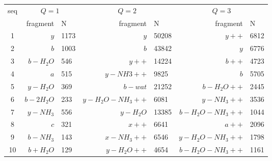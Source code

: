 \begin{table}
\begin{center}
\footnotesize
\begin{tabular}{crlrlrl}
\hline \hline
seq & \multicolumn{2}{c}{$Q=1$}&
\multicolumn{2}{c}{$Q=2$}&\multicolumn{2}{c}{$Q=3$}\\
&  fragment & N & fragment & N & fragment & N \\
\hline
1 & $y		$& 1173 & $y 		$&  50208  &$ y++	        $&  6812\\
2 & $b 		$& 1003 & $b 		$&  43842  &$ y 		$&  6776\\
3 & $b-H_2O 	$&  546 & $y++ 		$&  14224  &$ b++		$&  4723\\
4 & $a  	$&  515 & $y-NH3++ 	$&   9825  &$ b			$&  5705\\
5 & $y-H_2O 	$&  369 & $b-wat 	$&  21252  &$ b-H_2O++   	$&  2445\\
6 & $b-2H_2O 	$&  233 & $y-H_2O-NH_3++$&   6081  &$ y-NH_3++   	$&  3536\\
7 & $y-NH_3 	$&  556 & $y-H_2O 	$&  13385  &$ b-H_2O-NH_3++	$&  1044\\
8 & $c 		$&  321 & $x++		$&   6641  &$ a++       	$&  2096\\
9 & $b-NH_3 	$&  143 & $x-NH_3++	$&   6546  &$ y-H_2O-NH_3++	$&  1798\\
10 & $b+H_2O 	$&  129 & $y-H_2O++	$&   4654  &$ b-H_2O-NH_3++	$&  1161\\

\end{tabular}
\end{center}
\end{table}
